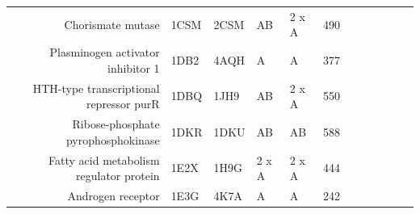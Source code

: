 \begin{table}
\begin{scriptsize}
\begin{tabular}{ r p{0.8cm} p{0.8cm} p{0.8cm} p{0.8cm} r r r r r r r }
\multicolumn{1}{r}{Chorismate mutase} & \multicolumn{1}{l}{1CSM} & \multicolumn{1}{l}{2CSM} & \multicolumn{1}{l}{AB} & \multicolumn{1}{l}{2 x A} & 490   & \cellcolor[rgb]{ 1,  .494,  .475}  & \cellcolor[rgb]{ 1,  .494,  .475}  & \cellcolor[rgb]{ 1,  .494,  .475}  & \cellcolor[rgb]{ .573,  .816,  .314}  & \cellcolor[rgb]{ 1,  .494,  .475}  & \cellcolor[rgb]{ .573,  .816,  .314}  \\
\multicolumn{1}{r}{Plasminogen activator inhibitor 1} & \multicolumn{1}{l}{1DB2} & \multicolumn{1}{l}{4AQH} & \multicolumn{1}{l}{A} & \multicolumn{1}{l}{A} & 377   & \cellcolor[rgb]{ 1,  .494,  .475}  & \cellcolor[rgb]{ .573,  .816,  .314}  & \cellcolor[rgb]{ 1,  .494,  .475}  & \cellcolor[rgb]{ .573,  .816,  .314}  & \cellcolor[rgb]{ .573,  .816,  .314}  & \cellcolor[rgb]{ .573,  .816,  .314}  \\
\multicolumn{1}{r}{HTH-type transcriptional repressor purR} & \multicolumn{1}{l}{1DBQ} & \multicolumn{1}{l}{1JH9} & \multicolumn{1}{l}{AB} & \multicolumn{1}{l}{2 x A} & 550   & \cellcolor[rgb]{ .573,  .816,  .314}  & \cellcolor[rgb]{ 1,  .494,  .475}  & \cellcolor[rgb]{ 1,  .494,  .475}  & \cellcolor[rgb]{ 1,  .494,  .475}  & \cellcolor[rgb]{ 1,  .494,  .475}  & \cellcolor[rgb]{ 1,  .494,  .475}  \\
\multicolumn{1}{r}{Ribose-phosphate pyrophosphokinase} & \multicolumn{1}{l}{1DKR} & \multicolumn{1}{l}{1DKU} & \multicolumn{1}{l}{AB} & \multicolumn{1}{l}{AB} & 588   & \cellcolor[rgb]{ .573,  .816,  .314}  & \cellcolor[rgb]{ 1,  .494,  .475}  & \cellcolor[rgb]{ .573,  .816,  .314}  & \cellcolor[rgb]{ 1,  .494,  .475}  & \cellcolor[rgb]{ .573,  .816,  .314}  & \cellcolor[rgb]{ 1,  .494,  .475}  \\
\multicolumn{1}{r}{Fatty acid metabolism regulator protein} & \multicolumn{1}{l}{1E2X} & \multicolumn{1}{l}{1H9G} & \multicolumn{1}{l}{2 x A} & \multicolumn{1}{l}{2 x A} & 444   & \cellcolor[rgb]{ 1,  .494,  .475}  & \cellcolor[rgb]{ 1,  .494,  .475}  & \cellcolor[rgb]{ 1,  .494,  .475}  & \cellcolor[rgb]{ .573,  .816,  .314}  & \cellcolor[rgb]{ .573,  .816,  .314}  & \cellcolor[rgb]{ .573,  .816,  .314}  \\
\multicolumn{1}{r}{Androgen receptor} & \multicolumn{1}{l}{1E3G} & \multicolumn{1}{l}{4K7A} & \multicolumn{1}{l}{A} & \multicolumn{1}{l}{A} & 242   & \cellcolor[rgb]{ 1,  .494,  .475}  & \cellcolor[rgb]{ 1,  .494,  .475}  & \cellcolor[rgb]{ 1,  .494,  .475}  & \cellcolor[rgb]{ 1,  .494,  .475}  & \cellcolor[rgb]{ 1,  .494,  .475}  & \cellcolor[rgb]{ 1,  .494,  .475}  \\

\end{tabular}
\end{scriptsize}
\end{table}

